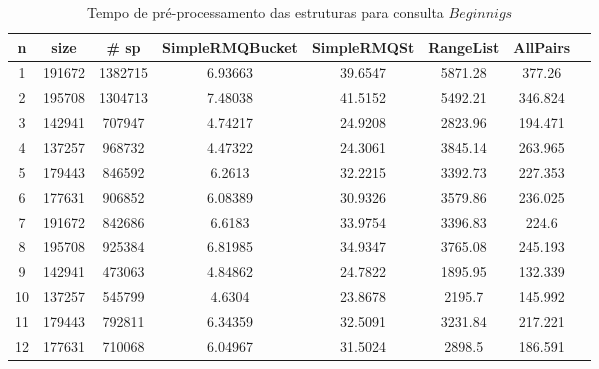 \documentclass[12pt]{article}
\begin{document}
\begin{table}
\small
\begin{center}
\begin{tabular}{|c|c|c|c|c|c|c|c|}
\hline
\textbf{n} & \textbf{size} & \textbf{\# sp} & \textbf{SimpleRMQBucket} & \textbf{SimpleRMQSt} & \textbf{RangeList} & \textbf{AllPairs}\\
\hline
1 &  191672 & 1382715 & 6.93663 & 39.6547 & 5871.28 & 377.26\\
\hline
2 & 195708 & 1304713 & 7.48038 & 41.5152 & 5492.21 & 346.824\\
\hline
3 & 142941 & 707947 & 4.74217 & 24.9208 & 2823.96 & 194.471\\
\hline
4 & 137257 & 968732 & 4.47322 & 24.3061 & 3845.14 & 263.965\\
\hline
5 & 179443 & 846592 & 6.2613 & 32.2215 & 3392.73 & 227.353\\
\hline
6 & 177631 & 906852 & 6.08389 & 30.9326 & 3579.86 & 236.025\\
\hline
7 & 191672 & 842686 & 6.6183 & 33.9754 & 3396.83 & 224.6\\
\hline
8 & 195708 & 925384 & 6.81985 & 34.9347 & 3765.08 & 245.193\\
\hline
9 & 142941 & 473063 & 4.84862 & 24.7822 & 1895.95 & 132.339\\
\hline
10 & 137257 & 545799 & 4.6304 & 23.8678 & 2195.7 & 145.992\\
\hline
11 & 179443 & 792811 & 6.34359 & 32.5091 & 3231.84 & 217.221\\
\hline
12 & 177631 & 710068 & 6.04967 & 31.5024 & 2898.5 & 186.591\\
\hline
\end{tabular}
\end{center}
\label{tab:beg_pre_series}
\caption{Tempo de pré-processamento das estruturas para consulta $Beginnigs$}
\end{table}
\end{document}
